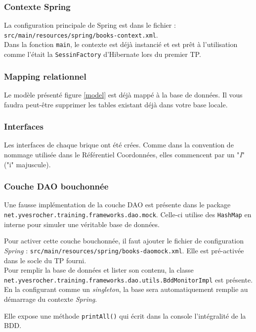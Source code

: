 \documentclass[small,algo]{dushClass}
\begin{document}
\subsubsection{Contexte Spring}
La configuration principale de Spring est dans le fichier : \texttt{src/main/resources/spring/books-context.xml}.\\

Dans la fonction \texttt{main}, le contexte est déjà instancié et est prêt à l'utilisation comme l'était la \texttt{SessinFactory} d'Hibernate lors du premier TP.

\subsubsection{Mapping relationnel}
Le modèle présenté figure \ref{model}  est déjà mappé à la base de données. Il vous faudra peut-être supprimer les tables existant déjà dans votre base locale.

\subsubsection{Interfaces}
Les interfaces de chaque brique ont été crées. Comme dans la convention de nommage utilisée dans le Référentiel Coordonnées, elles commencent par un "\emph{I}" ("i" majuscule).


\subsubsection{Couche DAO bouchonnée}
Une fausse implémentation de la couche DAO est présente dans le package \texttt{net.yvesrocher.training.frameworks.dao.mock}. Celle-ci utilise des \texttt{HashMap} en interne pour simuler une véritable base de données.\par
Pour activer cette couche bouchonnée, il faut ajouter le fichier de configuration \emph{Spring} : \texttt{src/main/resources/spring/books-daomock.xml}. Elle est pré-activée dans le socle du TP fourni.\\

Pour remplir la base de données et lister son contenu, la classe \texttt{net.yvesrocher.training.frameworks.dao.utils.BddMonitorImpl} est présente. En la configurant comme un \emph{singleton}, la base sera automatiquement remplie au démarrage du contexte \emph{Spring}.\par
Elle expose une méthode \texttt{printAll()} qui écrit dans la console l'intégralité de la BDD.
\end{document}
